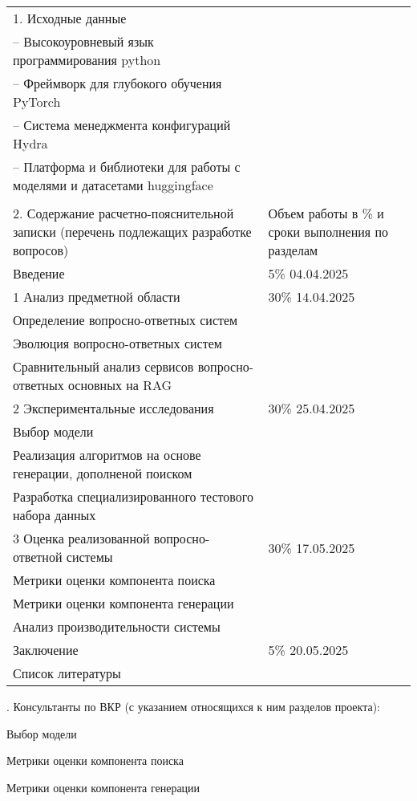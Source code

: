 {\begin{longtable}{p{}|p{}}
1. Исходные данные\\
-- Высокоуровневый язык программирования python \\
-- Фреймворк для глубокого обучения PyTorch \\
-- Система менеджмента конфигураций Hydra \\
-- Платформа и библиотеки для работы с моделями и датасетами huggingface \\
\\
2. Содержание расчетно-пояснительной записки (перечень подлежащих разработке вопросов)
& Объем работы в \% и сроки выполнения по разделам\\
Введение & 5\% \hfill 04.04.2025\\
1 Анализ предметной области & 30\% \hfill 14.04.2025\\
Определение вопросно-ответных систем\\
Эволюция вопросно-ответных систем\\
Сравнительный анализ сервисов вопросно-ответных основных на RAG \\
2 Экспериментальные исследования & 30\% \hfill 25.04.2025 \\
Выбор модели \\
Реализация алгоритмов на основе генерации, дополненой поиском\\
Разработка специализированного тестового набора данных\\
3 Оценка реализованной вопросно-ответной системы & 30\% \hfill 17.05.2025\\
Метрики оценки компонента поиска\\
Метрики оценки компонента генерации\\
Анализ производительности системы\\
Заключение & 5\% \hfill 20.05.2025\\
Список литературы & \\
\end{longtable}

\thispagestyle{empty}
. Консультанты по ВКР (с указанием относящихся к ним разделов проекта):

 Выбор модели

 Метрики оценки компонента поиска

 Метрики оценки компонента генерации

\vspace{2em}

}
